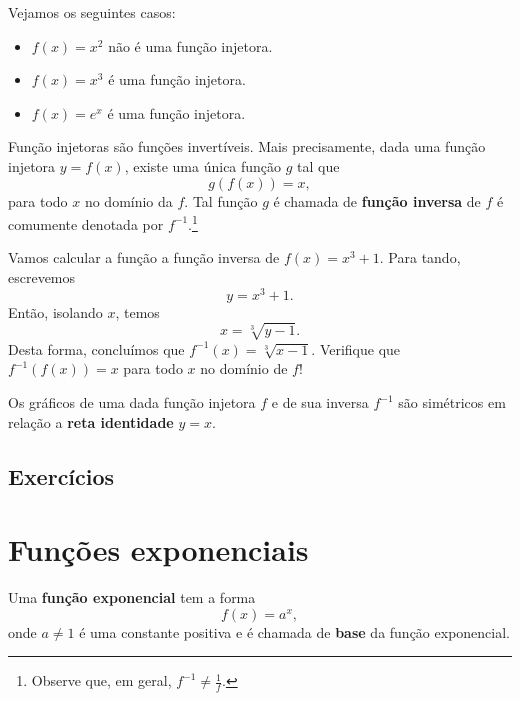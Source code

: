 \begin{ex}
  Vejamos os seguintes casos:
  \begin{itemize}
  \item $f(x) = x^2$ não é uma função injetora.
  \item $f(x) = x^3$ é uma função injetora.
  \item $f(x) = e^x$ é uma função injetora.
  \end{itemize}
\end{ex}

Função injetoras são funções invertíveis. Mais precisamente, dada uma função injetora $y = f(x)$, existe uma única função $g$ tal que
\begin{equation}
  g(f(x)) = x,
\end{equation}
para todo $x$ no domínio da $f$. Tal função $g$ é chamada de {\bf função inversa} de $f$ é comumente denotada por $f^{-1}$.\footnote{Observe que, em geral, $f^{-1} \neq \frac{1}{f}$.}

\begin{ex}
  Vamos calcular a função a função inversa de $f(x) = x^3 + 1$. Para tando, escrevemos
  \begin{equation}
    y = x^3 + 1.
  \end{equation}
  Então, isolando $x$, temos
  \begin{equation}
    x = \sqrt[3]{y - 1}.
  \end{equation}
  Desta forma, concluímos que $f^{-1}(x) = \sqrt[3]{x-1}$. Verifique que $f^{-1}(f(x)) = x$ para todo $x$ no domínio de $f$!
\end{ex}

\begin{obs}
 Os gráficos de uma dada função injetora $f$ e de sua inversa $f^{-1}$ são simétricos em relação a {\bf reta identidade} $y=x$.
\end{obs}

\subsection*{Exercícios}

\emconstrucao

\section{Funções exponenciais}\label{cap_funcao_sec_funexp}

Uma {\bf função exponencial} tem a forma
\begin{equation}
  f(x) = a^x,
\end{equation}
onde $a\neq 1$ é uma constante positiva e é chamada de {\bf base} da função exponencial.

